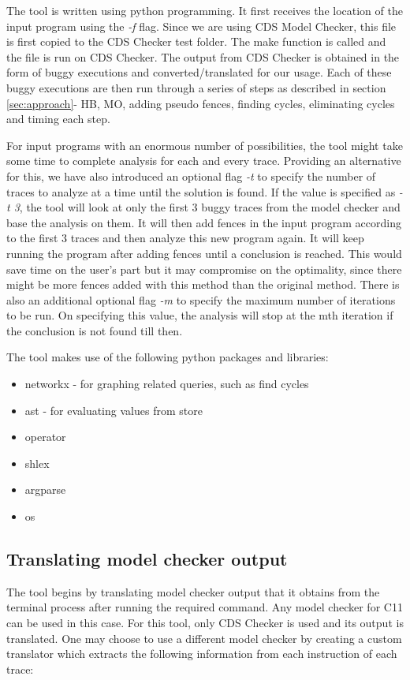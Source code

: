 \par
The tool is written using python programming. It first receives the location of the input program using the \textit{-f} flag. Since we are using CDS Model Checker, this file is first copied to the CDS Checker test folder. The make function is called and the file is run on CDS Checker. The output from CDS Checker is obtained in the form of buggy executions and converted/translated for our usage. Each of these buggy executions are then run through a series of steps as described in section \ref{sec:approach}- HB, MO, adding pseudo fences, finding cycles, eliminating cycles and timing each step.

For input programs with an enormous number of possibilities, the tool might take some time to complete analysis for each and every trace. Providing an alternative for this, we have also introduced an optional flag \textit{-t} to specify the number of traces to analyze at a time until the solution is found. If the value is specified as \textit{-t 3}, the tool will look at only the first 3 buggy traces from the model checker and base the analysis on them. It will then add fences in the input program according to the first 3 traces and then analyze this new program again. It will keep running the program after adding fences until a conclusion is reached. This would save time on the user's part but it may compromise on the optimality, since there might be more fences added with this method than the original method. There is also an additional optional flag \textit{-m} to specify the maximum number of iterations to be run. On specifying this value, the analysis will stop at the mth iteration if the conclusion is not found till then.

The tool makes use of the following python packages and libraries:
\begin{itemize}
	\item networkx - for graphing related queries, such as find cycles
	\item ast - for evaluating values from store
	\item operator
	\item shlex
	\item argparse
	\item os
\end{itemize}

\subsection{Translating model checker output}
The tool begins by translating model checker output that it obtains from the terminal process after running the required command. Any model checker for C11 can be used in this case. For this tool, only CDS Checker is used and its output is translated. One may choose to use a different model checker by creating a custom translator which extracts the following information from each instruction of each trace:


